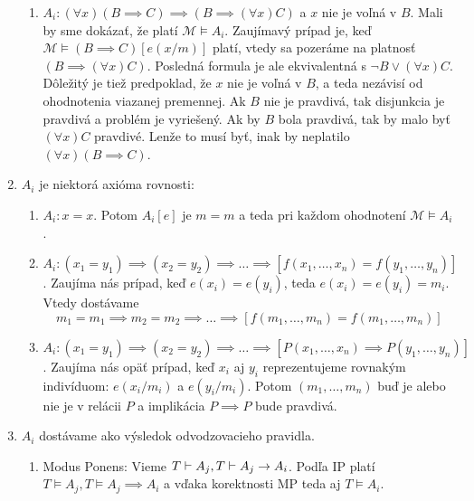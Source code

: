 \begin{dokaz}
\begin{enumerate}
\begin{enumerate}
        \item $A_i: (\forall x) (B \implies C) \implies (B \implies
            (\forall x) C)$ a $x$ nie je voľná v $B$.
            Mali by sme dokázať, že platí $\mathcal{M} \models A_i$.
            Zaujímavý prípad je, keď
            $\mathcal{M} \models (B \implies C)[e(x/m)]$ platí, vtedy sa
            pozeráme na platnosť $(B \implies (\forall x)C)$.
            Posledná formula je ale ekvivalentná s $\neg B \lor (\forall x) C$.
            Dôležitý je tiež predpoklad, že $x$ nie je voľná v $B$,
            a teda nezávisí od ohodnotenia viazanej premennej.
            Ak $B$ nie je pravdivá, tak disjunkcia je pravdivá a
            problém je vyriešený.
            Ak by $B$ bola pravdivá, tak by malo byť $(\forall x) C$
            pravdivé. Lenže to musí byť, inak by neplatilo
            $(\forall x) (B \implies C)$.
    \end{enumerate}

    \item $A_i$ je niektorá axióma rovnosti:
    \begin{enumerate}
        \item $A_i: x=x$. Potom $A_i[e]$ je $m=m$ a teda pri každom
            ohodnotení $\mathcal{M} \models A_i$.

        \item $A_i: (x_1 = y_1) \implies (x_2 = y_2) \implies \ldots 
            \implies [f(x_1, \ldots, x_n) = f(y_1, \ldots, y_n)]$.
            Zaujíma nás prípad, keď  $e(x_i) = e(y_i)$, teda
            $e(x_i)=e(y_i)=m_i$. Vtedy dostávame
            \begin{equation*}
              m_1=m_1 \implies m_2=m_2 \implies \ldots
                \implies [f(m_1, \dots, m_n) =f(m_1, \dots, m_n)]
            \end{equation*}

        \item $A_i: (x_1 = y_1) \implies (x_2 = y_2) \implies \ldots 
            \implies [P(x_1, \ldots, x_n) \implies P(y_1, \ldots, y_n)]$.
            Zaujíma nás opäť prípad, keď $x_i$ aj $y_i$ reprezentujeme 
            rovnakým indivíduom: $e(x_i/m_i)$ a $e(y_i/m_i)$.
            Potom $(m_1,\dots,m_n)$ buď je alebo nie je v relácii $P$
            a implikácia $P \implies P$ bude pravdivá.
    \end{enumerate}

    \item $A_i$ dostávame ako výsledok odvodzovacieho pravidla.
        \begin{enumerate}
        \item Modus Ponens:
            Vieme
            $T \vdash A_j, T \vdash A_j \rightarrow A_i$.
            Podľa IP platí
            $T \models A_j, T \models A_j \implies A_i$ a vďaka
            korektnosti MP teda aj $T \models A_i$.


\end{enumerate}
\end{enumerate}
\end{dokaz}
